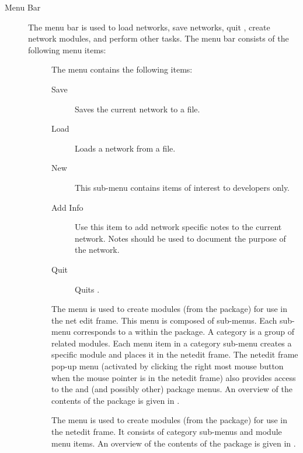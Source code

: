 \begin{description}
\item[Menu Bar] The menu bar is used to load networks, save networks, quit
  \sr, create network modules, and perform other tasks.  The menu bar
  consists of the following menu items:

  \begin{description}
  \item[] The  menu contains the following items:
    \begin{description}
    \item[Save] Saves the current network to a file.
    \item[Load] Loads a network from a file.
    \item[New] This sub-menu contains items of interest to developers only.
    \item[Add Info] Use this item to add network specific notes to
      the current network.  Notes should be used to document the purpose of
      the network.
    \item[Quit] Quits \sr.
    \end{description}
  \end{description}
  
  \begin{description}
  \item[] The  menu is used to create modules
    (from the \sr{} package) for use in the net edit frame.  This menu is
    composed of sub-menus. Each sub-menu corresponds to a 
     within the \sr{} package.  A category is a group of
    related modules.  Each menu item in a category sub-menu creates a
    specific module and places it in the netedit frame.  The netedit frame
    pop-up menu (activated by clicking the right most mouse button when the
    mouse pointer is in the netedit frame) also provides access to the
    \menu{\sr{}} and \menu{\pse{}} (and possibly other) package menus.  An
    overview of the contents of the \sr{} package is given in .
  \end{description}

  \begin{description}
  \item[] The  menu is used to create modules
    (from the \pse package) for use in the netedit frame.  It consists
    of category sub-menus and module menu items.   An overview of the
    contents of the \sr{} package is given in .
  \end{description}


\end{description}
